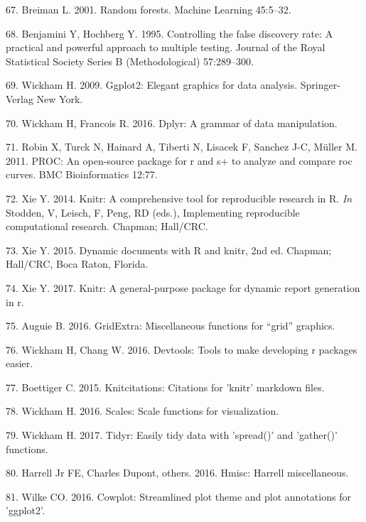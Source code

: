 \documentclass[11pt,]{article}
\begin{document}
\hypertarget{ref-breiman_rf_2001}{}
67. Breiman L. 2001. Random forests. Machine Learning 45:5--32.

\hypertarget{ref-Benjamini_Hochberg_1995}{}
68. Benjamini Y, Hochberg Y. 1995. Controlling the false discovery rate:
A practical and powerful approach to multiple testing. Journal of the
Royal Statistical Society Series B (Methodological) 57:289--300.

\hypertarget{ref-ggplot2}{}
69. Wickham H. 2009. Ggplot2: Elegant graphics for data analysis.
Springer-Verlag New York.

\hypertarget{ref-dplyr}{}
70. Wickham H, Francois R. 2016. Dplyr: A grammar of data manipulation.

\hypertarget{ref-pROC}{}
71. Robin X, Turck N, Hainard A, Tiberti N, Lisacek F, Sanchez J-C,
Müller M. 2011. PROC: An open-source package for r and s+ to analyze and
compare roc curves. BMC Bioinformatics 12:77.

\hypertarget{ref-knitr2014}{}
72. Xie Y. 2014. Knitr: A comprehensive tool for reproducible research
in R. \emph{In} Stodden, V, Leisch, F, Peng, RD (eds.), Implementing
reproducible computational research. Chapman; Hall/CRC.

\hypertarget{ref-knitr2015}{}
73. Xie Y. 2015. Dynamic documents with R and knitr, 2nd ed. Chapman;
Hall/CRC, Boca Raton, Florida.

\hypertarget{ref-knitr2017}{}
74. Xie Y. 2017. Knitr: A general-purpose package for dynamic report
generation in r.

\hypertarget{ref-gridExtra}{}
75. Auguie B. 2016. GridExtra: Miscellaneous functions for ``grid''
graphics.

\hypertarget{ref-devtools}{}
76. Wickham H, Chang W. 2016. Devtools: Tools to make developing r
packages easier.

\hypertarget{ref-knitcitations}{}
77. Boettiger C. 2015. Knitcitations: Citations for 'knitr' markdown
files.

\hypertarget{ref-scales}{}
78. Wickham H. 2016. Scales: Scale functions for visualization.

\hypertarget{ref-tidyr}{}
79. Wickham H. 2017. Tidyr: Easily tidy data with 'spread()' and
'gather()' functions.

\hypertarget{ref-Hmisc}{}
80. Harrell Jr FE, Charles Dupont, others. 2016. Hmisc: Harrell
miscellaneous.

\hypertarget{ref-cowplot}{}
81. Wilke CO. 2016. Cowplot: Streamlined plot theme and plot annotations
for 'ggplot2'.
\end{document}
